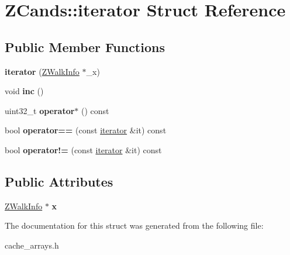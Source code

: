 \hypertarget{structZCands_1_1iterator}{\section{Z\-Cands\-:\-:iterator Struct Reference}
\label{structZCands_1_1iterator}
}
\subsection*{Public Member Functions}
\begin{DoxyCompactItemize}
\item 
\hypertarget{structZCands_1_1iterator_a4b4548639cc7d99650327cb52c4edc3c}{{\bfseries iterator} (\hyperlink{structZWalkInfo}{Z\-Walk\-Info} $\ast$\-\_\-x)}\label{structZCands_1_1iterator_a4b4548639cc7d99650327cb52c4edc3c}

\item 
\hypertarget{structZCands_1_1iterator_a0ef9934aac0a47a26a6668b50af02c48}{void {\bfseries inc} ()}\label{structZCands_1_1iterator_a0ef9934aac0a47a26a6668b50af02c48}

\item 
\hypertarget{structZCands_1_1iterator_a93386f66f4e54d43b4176b95687a37fa}{uint32\-\_\-t {\bfseries operator$\ast$} () const }\label{structZCands_1_1iterator_a93386f66f4e54d43b4176b95687a37fa}

\item 
\hypertarget{structZCands_1_1iterator_a0a5289939bdd7ecb218004dc120018d0}{bool {\bfseries operator==} (const \hyperlink{structZCands_1_1iterator}{iterator} \&it) const }\label{structZCands_1_1iterator_a0a5289939bdd7ecb218004dc120018d0}

\item 
\hypertarget{structZCands_1_1iterator_a2186c9225865a44ee9fd447edbef860b}{bool {\bfseries operator!=} (const \hyperlink{structZCands_1_1iterator}{iterator} \&it) const }\label{structZCands_1_1iterator_a2186c9225865a44ee9fd447edbef860b}

\end{DoxyCompactItemize}
\subsection*{Public Attributes}
\begin{DoxyCompactItemize}
\item 
\hypertarget{structZCands_1_1iterator_a694e18c590c8400344a37ce2a055849e}{\hyperlink{structZWalkInfo}{Z\-Walk\-Info} $\ast$ {\bfseries x}}\label{structZCands_1_1iterator_a694e18c590c8400344a37ce2a055849e}

\end{DoxyCompactItemize}


The documentation for this struct was generated from the following file\-:\begin{DoxyCompactItemize}
\item 
cache\-\_\-arrays.\-h\end{DoxyCompactItemize}
